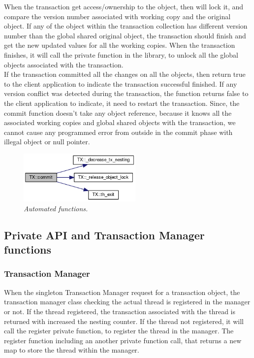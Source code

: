 \documentclass[12pt]{article}
\begin{document}
When the transaction get access/ownership to the object, then will lock it, and compare the version number associated with working copy and the original object. If any of the object within the transaction collection has different version number than the global shared original object, the transaction should finish and get the new updated values for all the working copies. When the transaction finishes, it will call the private function in the library, to unlock all the global objects associated with the transaction.\\

If the transaction committed all the changes on all the objects, then return true to the client application to indicate the transaction successful finished. If any version conflict was detected during the transaction, the function  returns false to the client application to indicate, it need to restart the transaction. Since, the commit function doesn't take any object reference, because it knows all the associated working copies and global shared objects with the transaction, we cannot cause any programmed error from outside in the commit phase with illegal object or null pointer.

\begin{figure}[h!]
\centering
\includegraphics[width=6cm]{Pictures/commit.png}
\caption*{\textit{\color{gray}Automated functions.}}
\end{figure}

\subsection{Private API and Transaction Manager functions}
\subsubsection{Transaction Manager}
When the singleton Transaction Manager request for a transaction object, the transaction manager class checking the actual thread is registered in the manager or not. If the thread registered, the transaction associated with the thread is returned with increased the nesting counter. If the thread not registered, it will call the register private function, to register the thread in the manager. The register function including an another private function call, that returns a new map to store the thread within the manager.
\end{document}
